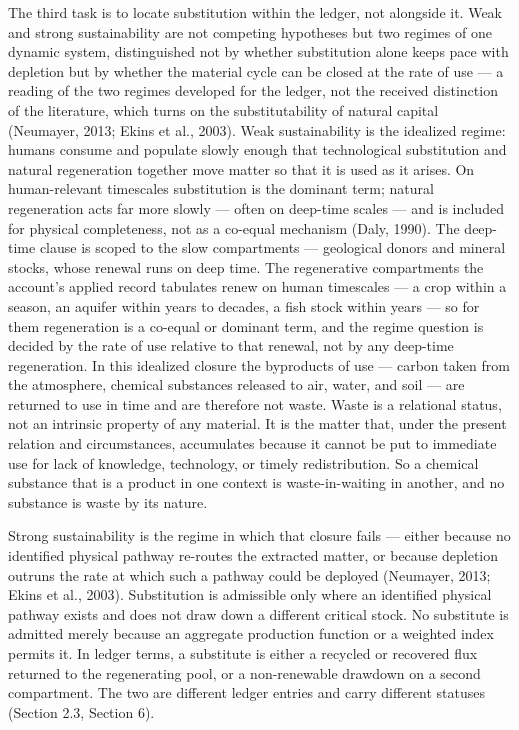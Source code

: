 \documentclass[11pt]{article}
\begin{document}
The third task is to locate substitution within the ledger, not alongside it. Weak and strong sustainability are not competing hypotheses but two regimes of one dynamic system, distinguished not by whether substitution alone keeps pace with depletion but by whether the material cycle can be closed at the rate of use --- a reading of the two regimes developed for the ledger, not the received distinction of the literature, which turns on the substitutability of natural capital (Neumayer, 2013; Ekins et al., 2003). Weak sustainability is the idealized regime: humans consume and populate slowly enough that technological substitution and natural regeneration together move matter so that it is used as it arises. On human-relevant timescales substitution is the dominant term; natural regeneration acts far more slowly --- often on deep-time scales --- and is included for physical completeness, not as a co-equal mechanism (Daly, 1990). The deep-time clause is scoped to the slow compartments --- geological donors and mineral stocks, whose renewal runs on deep time. The regenerative compartments the account's applied record tabulates renew on human timescales --- a crop within a season, an aquifer within years to decades, a fish stock within years --- so for them regeneration is a co-equal or dominant term, and the regime question is decided by the rate of use relative to that renewal, not by any deep-time regeneration. In this idealized closure the byproducts of use --- carbon taken from the atmosphere, chemical substances released to air, water, and soil --- are returned to use in time and are therefore not waste. Waste is a relational status, not an intrinsic property of any material. It is the matter that, under the present relation and circumstances, accumulates because it cannot be put to immediate use for lack of knowledge, technology, or timely redistribution. So a chemical substance that is a product in one context is waste-in-waiting in another, and no substance is waste by its nature.

Strong sustainability is the regime in which that closure fails --- either because no identified physical pathway re-routes the extracted matter, or because depletion outruns the rate at which such a pathway could be deployed (Neumayer, 2013; Ekins et al., 2003). Substitution is admissible only where an identified physical pathway exists and does not draw down a different critical stock. No substitute is admitted merely because an aggregate production function or a weighted index permits it. In ledger terms, a substitute is either a recycled or recovered flux returned to the regenerating pool, or a non-renewable drawdown on a second compartment. The two are different ledger entries and carry different statuses (Section 2.3, Section 6).
\end{document}
